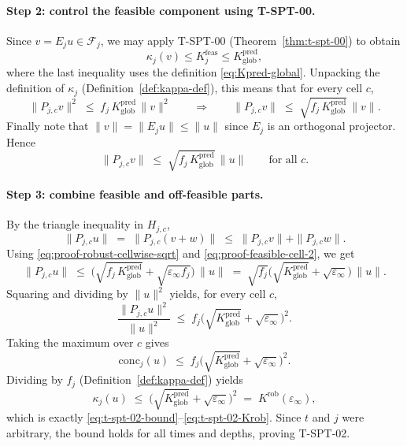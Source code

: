 \documentclass[11pt]{article}
\newcommand{\conc}{\mathrm{conc}}
\begin{document}
\paragraph{Step 2: control the feasible component using T-SPT-00.}
Since $v=E_j u\in\mathcal{F}_j$, we may apply T-SPT-00 (Theorem~\ref{thm:t-spt-00}) to obtain
\[
\kappa_j(v)\le K^{\mathrm{feas}}_j \le K^{\mathrm{pred}}_{\mathrm{glob}},
\]
where the last inequality uses the definition \eqref{eq:Kpred-global}.
Unpacking the definition of $\kappa_j$ (Definition~\ref{def:kappa-def}), this means that for every cell $c$,
\begin{equation}\label{eq:proof-feasible-cell}
\|P_{j,c}v\|^2 \;\le\; f_j\,K^{\mathrm{pred}}_{\mathrm{glob}}\,\|v\|^2
\qquad\Rightarrow\qquad
\|P_{j,c}v\|\;\le\;\sqrt{f_j\,K^{\mathrm{pred}}_{\mathrm{glob}}}\,\|v\|.
\end{equation}
Finally note that $\|v\|=\|E_j u\|\le \|u\|$ since $E_j$ is an orthogonal projector.
Hence
\begin{equation}\label{eq:proof-feasible-cell-2}
\|P_{j,c}v\|
\;\le\;
\sqrt{f_j\,K^{\mathrm{pred}}_{\mathrm{glob}}}\,\|u\|
\qquad \text{for all } c.
\end{equation}

\paragraph{Step 3: combine feasible and off-feasible parts.}
By the triangle inequality in $H_{j,c}$,
\[
\|P_{j,c}u\|
\;=\;
\|P_{j,c}(v+w)\|
\;\le\;
\|P_{j,c}v\|+\|P_{j,c}w\|.
\]
Using \eqref{eq:proof-robust-cellwise-sqrt} and \eqref{eq:proof-feasible-cell-2}, we get
\[
\|P_{j,c}u\|
\;\le\;
\Big(\sqrt{f_j\,K^{\mathrm{pred}}_{\mathrm{glob}}} + \sqrt{\varepsilon_\infty f_j}\Big)\,\|u\|
\;=\;
\sqrt{f_j}\Big(\sqrt{K^{\mathrm{pred}}_{\mathrm{glob}}} + \sqrt{\varepsilon_\infty}\Big)\,\|u\|.
\]
Squaring and dividing by $\|u\|^2$ yields, for every cell $c$,
\[
\frac{\|P_{j,c}u\|^2}{\|u\|^2}
\;\le\;
f_j\Big(\sqrt{K^{\mathrm{pred}}_{\mathrm{glob}}} + \sqrt{\varepsilon_\infty}\Big)^2.
\]
Taking the maximum over $c$ gives
\[
\conc_j(u)\;\le\; f_j\Big(\sqrt{K^{\mathrm{pred}}_{\mathrm{glob}}} + \sqrt{\varepsilon_\infty}\Big)^2.
\]
Dividing by $f_j$ (Definition~\ref{def:kappa-def}) yields
\[
\kappa_j(u)
\;\le\;
\Big(\sqrt{K^{\mathrm{pred}}_{\mathrm{glob}}} + \sqrt{\varepsilon_\infty}\Big)^2
\;=\;
K^{\mathrm{rob}}(\varepsilon_\infty),
\]
which is exactly \eqref{eq:t-spt-02-bound}--\eqref{eq:t-spt-02-Krob}.
Since $t$ and $j$ were arbitrary, the bound holds for all times and depths, proving T-SPT-02.
\end{document}
